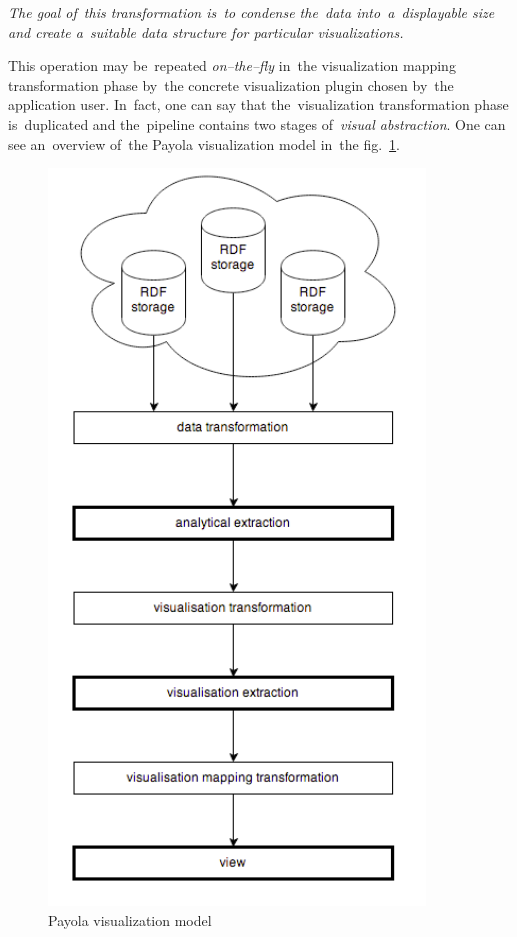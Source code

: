 \emph{The goal of~this transformation is~to condense the~data into~a~displayable size and create
a~suitable data structure for particular visualizations.}

This operation may be~repeated \emph{on--the--fly} in~the visualization mapping transformation
phase by~the concrete visualization plugin chosen by~the application user. In~fact, one can
say that the~visualization transformation phase is~duplicated and the~pipeline contains two
stages of~\emph{visual abstraction}. One can see an~overview of~the Payola 
visualization model in~the fig.~\ref{fig:payola_model}.

\begin{figure}
	\centering
	\includegraphics[width=100mm]{img/payola_model.png}
	\caption{Payola visualization model}
	\label{fig:payola_model}
\end{figure}

